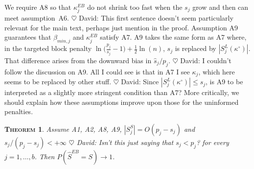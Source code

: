 \documentclass[aos]{imsart}
\theoremstyle{plain}
\newtheorem{thm}{\textsc{Theorem}}[section]
\newcommand{\david}[1]{{\small{\color{blue} \sf $\heartsuit$ David: #1}}}
\newcommand{\bs}{\boldsymbol}
\begin{document}
We require A8 so that $\kappa_j^{EB}$ do not shrink too fast when the $s_j$ grow and then can meet assumption~A6. \david{This first sentence doesn't seem particularly relevant for the main text, perhaps just mention in the proof.} Assumption A9 guarantees that $\beta_{min,j}$ and $\kappa_j^{EB}$ satisfy A7. A9 takes the same form as A7 where, in the targeted block penalty $\ln\big(\frac{p_j}{s_j}-1\big)+\tfrac 12\ln(n)$, $s_j$ is replaced by $|S^L_j(\kappa^{\circ})|$. That difference arises from the downward bias in $\widehat{s}_j/p_j$.
\david{I couldn't follow the discussion on A9. All I could see is that in A7 I see $\kappa_j$, which here seems to be replaced by other stuff.}
\david{Since $|S_j^L(\kappa^\circ)| \leq s_j$, is A9 to be interpreted as a slightly more stringent condition than A7? More critically, we should explain how these assumptions improve upon those for the uninformed penalties.} 
\begin{thm}\label{theo:empbayesselconsist}
    Assume A1, A2, A8, A9, $|S^S_j|=O(p_j-s_j)$ and $s_j / (p_j-s_j)<+\infty$ \david{Isn't this just saying that $s_j < p_j$?} for every $j=1,\ldots,b$. Then
$P(\hat{S}^{EB} = S) \to 1$.
\end{thm}


%    
\end{document}
